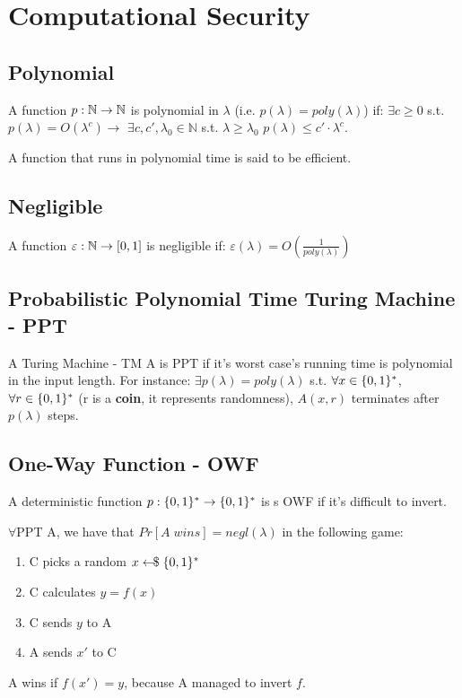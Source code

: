 \chapter{Computational Security}

\section{Polynomial}
A function $p : \mathbb{N} \rightarrow \mathbb{N}$ is polynomial in $\lambda$ (i.e. $p(\lambda) = poly(\lambda)$) if:\newline
$\exists c \geq  0$ s.t. $p(\lambda) = O(\lambda^c) \longrightarrow$ $\exists c,c',\lambda_0 \in \mathbb{N}$ s.t. $\lambda \geq \lambda_0$ $p(\lambda) \leq c' \cdot \lambda^c$.

A function that runs in polynomial time is said to be efficient.


\section{Negligible}
A function $\varepsilon : \mathbb{N} \rightarrow [0,1]$ is negligible if:\newline
$\varepsilon(\lambda) = O(\frac{1}{poly(\lambda)})$


\section{Probabilistic Polynomial Time Turing Machine - PPT}
A Turing Machine - TM A is PPT if it's worst case's running time is polynomial in the input length.\newline
For instance: $\exists p(\lambda) = poly(\lambda)$ s.t. $\forall x\in \{0,1\}^*$, $\forall r\in \{0,1\}^*$ (r is a \textbf{coin}, it represents randomness), $A(x,r)$ terminates after $p(\lambda)$ steps.


\section{One-Way Function - OWF}
A deterministic function $p : \{0,1\}^* \rightarrow \{0,1\}^*$ is s OWF if it's difficult to invert.

$\forall$PPT A, we have that $Pr[A \; wins] = negl(\lambda)$ in the following game:
\begin{enumerate}
    \item C picks a random $x \leftarrow\kern-0.42em{\$} \; \{0,1\}^*$
    \item C calculates $y = f(x)$
    \item C sends $y$ to A
    \item A sends $x'$ to C
\end{enumerate}

A wins if $f(x') = y$, because A managed to invert $f$.